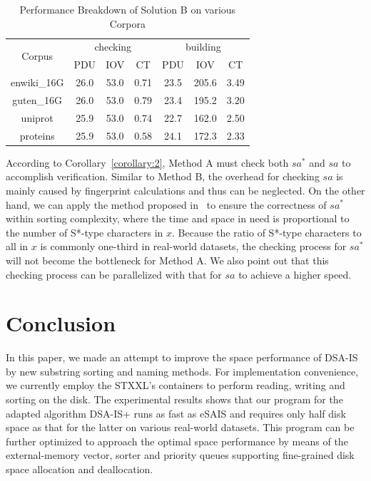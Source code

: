 \documentclass[10pt,journal,compsoc]{IEEEtran}
\begin{document}
\begin{table}%
	\caption{Performance Breakdown of Solution B on various Corpora}
	\label{tbl:breakdown_solutionb}
	\centering
	\begin{tabular}{|c|c|c|c|c|c|c|}
		\hline
		\multirow{2}{*}{Corpus} & \multicolumn{3}{|c}{checking} & \multicolumn{3}{|c|}{building} \\\cline{2-7}
		& PDU & IOV & CT & PDU & IOV & CT \\\hline
		enwiki\_16G & 26.0 & 53.0 & 0.71 & 23.5 & 205.6 & 3.49 \\\hline
		guten\_16G & 26.0 & 53.0 & 0.79 & 23.4 & 195.2 & 3.20 \\\hline
		uniprot & 25.9 & 53.0 & 0.74 & 22.7 & 162.0 & 2.50 \\\hline
		proteins & 25.9 & 53.0 & 0.58 & 24.1 & 172.3 & 2.33 \\\hline
	\end{tabular}
\end{table}%

According to Corollary~\ref{corollary:2}, Method A must check both $sa^*$ and $sa$ to accomplish verification. Similar to Method B, the overhead for checking $sa$ is mainly caused by fingerprint calculations and thus can be neglected. On the other hand, we can apply the method proposed in~\cite{wu2017} to ensure the correctness of $sa^*$ within sorting complexity, where the time and space in need is proportional to the number of S*-type characters in $x$. Because the ratio of S*-type characters to all in $x$ is commonly one-third in real-world datasets, the checking process for $sa^*$ will not become the bottleneck for Method A. We also point out that this checking process can be parallelized with that for $sa$ to achieve a higher speed.

\section{Conclusion} \label{sec:conclusion}

In this paper, we made an attempt to improve the space performance of DSA-IS by new substring sorting and naming methods. For implementation convenience, we currently employ the STXXL's containers to perform reading, writing and sorting on the disk. The experimental results shows that our program for the adapted algorithm DSA-IS+ runs as fast as eSAIS and requires only half disk space as that for the latter on various real-world datasets. This program can be further optimized to approach the optimal space performance by means of the external-memory vector, sorter and priority queues supporting fine-grained disk space allocation and deallocation.
\end{document}
